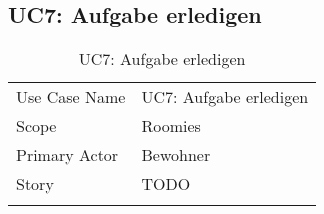 \subsection{UC7: Aufgabe erledigen}
\begin{table}[H]
	\tablestyle
	\tablealtcolored
	\begin{tabularx}{\textwidth}{lX}
		\tablebody
			Use Case Name &
			UC7: Aufgabe erledigen
			\tabularnewline
			Scope &
			Roomies
			\tabularnewline
			Primary Actor &
			Bewohner
			\tabularnewline
			Story &
			TODO
			\tabularnewline
		\tableend
	\end{tabularx}
	\caption{UC7: Aufgabe erledigen}
\end{table}


